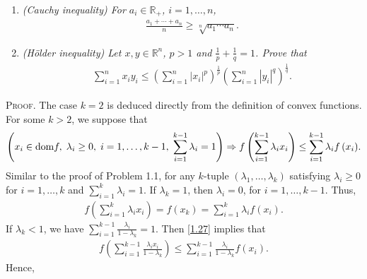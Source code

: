 \documentclass[a4paper]{article}
\numberwithin{equation}{section}
\begin{document}
\begin{enumerate}
\item \textit{(Cauchy inequality) For $a_i\in \mathbb{R}_+$, $i=1,\ldots,n$,}
\begin{align}
\label{1.25}
\frac{{{a_1} +  \cdots  + {a_n}}}{n} \ge \sqrt[n]{{{a_1} \cdots {a_n}}} .
\end{align}
\item \textit{(H\"{o}lder inequality) Let $x,y \in \mathbb{R}^n$, $p>1$ and $\frac{1}{p}+\frac{1}{q}=1$. Prove that}
\begin{align}
\label{1.26}
\sum\limits_{i = 1}^n {{x_i}{y_i}}  \le {\left( {\sum\limits_{i = 1}^n {{{\left| {{x_i}} \right|}^p}} } \right)^{\frac{1}{p}}}{\left( {\sum\limits_{i = 1}^n {{{\left| {{y_i}} \right|}^q}} } \right)^{\frac{1}{q}}}.
\end{align}
\end{enumerate}
\textsc{Proof.} The case $k=2$ is deduced directly from the definition of convex functions. For some $k >2$, we suppose that
\begin{align}
\label{1.27}
\left( {{x_i} \in \mbox{dom}f,\hspace{0.1cm}{\lambda _i} \ge 0,\hspace{0.1cm}i = 1, \ldots ,k - 1,\hspace{0.1cm} \sum\limits_{i = 1}^{k - 1} {{\lambda _i}}  = 1} \right) \Rightarrow f\left( {\sum\limits_{i = 1}^{k - 1} {{\lambda _i}{x_i}} } \right) \le \sum\limits_{i = 1}^{k - 1} {{\lambda _i}f\left( {{x_i}} \right)} .
\end{align}
Similar to the proof of Problem 1.1, for any $k$-tuple $\left(\lambda _1,\ldots,\lambda _k\right)$ satisfying $\lambda _i\ge 0$ for $i=1,\ldots,k$ and $\sum\nolimits_{i = 1}^k {{\lambda _i}}  = 1$. If $\lambda _k=1$, then $\lambda _i=0$, for $i=1,\ldots,k-1$. Thus, 
\begin{align}
f\left( {\sum\limits_{i = 1}^k {{\lambda _i}{x_i}} } \right) = f\left( {{x_k}} \right) = \sum\limits_{i = 1}^k {{\lambda _i}f\left( {{x_i}} \right)} .
\end{align}
If $\lambda _k<1$, we have $\sum\limits_{i = 1}^{k - 1} {\frac{{{\lambda _i}}}{{1 - {\lambda _k}}}}  = 1$. Then \eqref{1.27} implies that
\begin{align}
f\left( {\sum\limits_{i = 1}^{k - 1} {\frac{{{\lambda _i}{x_i}}}{{1 - {\lambda _k}}}} } \right) \le \sum\limits_{i = 1}^{k - 1} {\frac{{{\lambda _i}}}{{1 - {\lambda _k}}}f\left( {{x_i}} \right)} .
\end{align}
Hence, 
\end{document}
